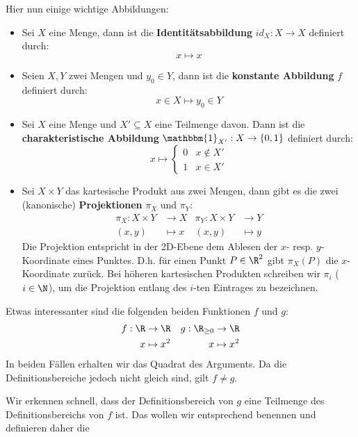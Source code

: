 \begin{example} \label{ex_important_functions} Hier nun einige wichtige Abbildungen:
\begin{itemize}
    \item Sei $X$ eine Menge, dann ist die \textbf{Identitätsabbildung} $id_X: X \to X$ definiert durch:
    $$ x \mapsto x$$
    \item Seien $X,Y$ zwei Mengen und $y_0 \in Y$, dann ist die \textbf{konstante Abbildung} $f$ definiert durch:
    $$ x \in X \mapsto y_0 \in Y $$
    \item Sei $X$ eine Menge und $X'\subseteq X$ eine Teilmenge davon. Dann ist die \textbf{charakteristische Abbildung} $\mathbbm{1}_{X'}: X \to \{0, 1\}$ definiert durch:
    $$ x \mapsto \begin{cases}0 & x \notin X' \\ 1 & x \in X' \end{cases} $$
    \item Sei $X\times Y$ das kartesische Produkt aus zwei Mengen, dann gibt es die zwei (kanonische) \textbf{Projektionen} $\pi_X$ und $\pi_Y$:
    \begin{align*}
        \pi_X: X\times Y &\to X & \pi_Y: X\times Y &\to Y \\
        (x,y) &\mapsto x & (x,y) &\mapsto y
    \end{align*}    
    Die Projektion entspricht in der 2D-Ebene dem Ablesen der $x$- resp. $y$-Koordinate eines Punktes. D.h. für einen Punkt $P \in \R^2$ gibt $\pi_X(P)$ die $x$-Koordinate zurück. Bei höheren kartesischen Produkten schreiben wir $\pi_i$ ($i\in \N$), um die Projektion entlang des $i$-ten Eintrages zu bezeichnen.
\end{itemize}

\end{example}

\begin{example}[ ] \label{ex_functions}
Etwas interessanter sind die folgenden beiden Funktionen $f$ und $g$:
\begin{align*}
f: \R &\to \R & g: \R_{\geq 0} &\to \R \\
x&\mapsto x^2&x&\mapsto x^2
\end{align*}
In beiden Fällen erhalten wir das Quadrat des Arguments. Da die Definitionsbereiche jedoch nicht gleich sind, gilt $f \neq g$.
\end{example}

Wir erkennen schnell, dass der Definitionsbereich von $g$ eine Teilmenge des Definitionsbereichs von $f$ ist. Das wollen wir entsprechend benennen und definieren daher die 

